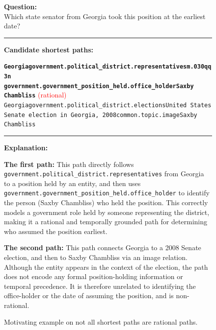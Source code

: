 \begin{figure}[t]
\begin{tcolorbox}[colback=gray!5!white,
                  colframe=gray!75!black,
                  title=WebQTrn-3696\_b874dcb19fa3a6c4e6037dc13f1f3bc4]
\scriptsize

\textbf{Question:}\\
Which state senator from Georgia took this position at the earliest date?

\rule{\linewidth}{0.4pt}

\textbf{Candidate shortest paths:}\\[2pt]
{\raggedright
\texttt{\textbf{Georgia\patharrow government.political\_district.representatives\patharrow m.030qq3n \\ \patharrow government.government\_position\_held.office\_holder\patharrow Saxby Chambliss}}\hfill
\textcolor{red}{(rational)}\\[6pt]

\texttt{Georgia\patharrow government.political\_district.elections\patharrow United States Senate election in Georgia, 2008\patharrow common.topic.image\patharrow Saxby Chambliss}\\[6pt]

\par}

\rule{\linewidth}{0.4pt}

\textbf{Explanation:}\\[2pt]
{\raggedright
\textbf{The first path:} This path directly follows \texttt{government.political\_district.representatives} from Georgia to a position held by an entity, and then uses \texttt{government.government\_position\_held.office\_holder} to identify the person (Saxby Chambliss) who held the position. This correctly models a government role held by someone representing the district, making it a rational and temporally grounded path for determining who assumed the position earliest.\par\vspace{6pt}

\textbf{The second path:} This path connects Georgia to a 2008 Senate election, and then to Saxby Chambliss via an image relation. Although the entity appears in the context of the election, the path does not encode any formal position-holding information or temporal precedence. It is therefore unrelated to identifying the office-holder or the date of assuming the position, and is non-rational.\par}

\end{tcolorbox}
\caption{Motivating example on not all shortest paths are rational paths.}
\label{fig:type1_no3}
\end{figure}



